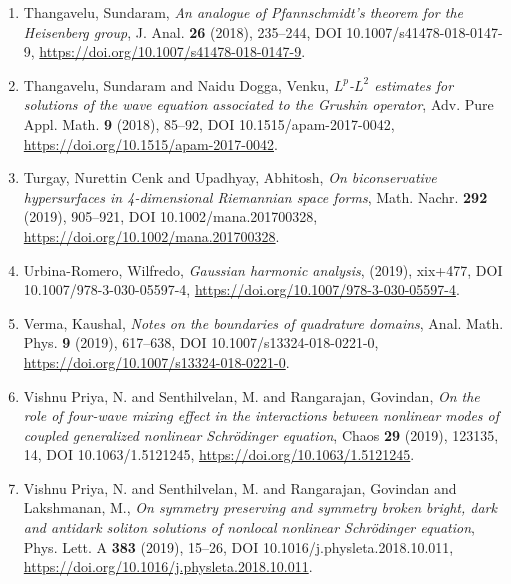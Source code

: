 \begin{enumerate}
\item Thangavelu, Sundaram, {\em An analogue of {P}fannschmidt's theorem for the {H}eisenberg
group}, J. Anal. {\bf 26} (2018), 235--244, DOI 10.1007/s41478-018-0147-9, \url{https://doi.org/10.1007/s41478-018-0147-9}.
\item Thangavelu, Sundaram and Naidu Dogga, Venku, {\em {$L^p$}-{$L^2$} estimates for solutions of the wave equation
associated to the {G}rushin operator}, Adv. Pure Appl. Math. {\bf 9} (2018), 85--92, DOI 10.1515/apam-2017-0042, \url{https://doi.org/10.1515/apam-2017-0042}.
\item Turgay, Nurettin Cenk and Upadhyay, Abhitosh, {\em On biconservative hypersurfaces in 4-dimensional {R}iemannian
space forms}, Math. Nachr. {\bf 292} (2019), 905--921, DOI 10.1002/mana.201700328, \url{https://doi.org/10.1002/mana.201700328}.
\item Urbina-Romero, Wilfredo, {\em Gaussian harmonic analysis},  {\bf } (2019), xix+477, DOI 10.1007/978-3-030-05597-4, \url{https://doi.org/10.1007/978-3-030-05597-4}.
\item Verma, Kaushal, {\em Notes on the boundaries of quadrature domains}, Anal. Math. Phys. {\bf 9} (2019), 617--638, DOI 10.1007/s13324-018-0221-0, \url{https://doi.org/10.1007/s13324-018-0221-0}.
\item Vishnu Priya, N. and Senthilvelan, M. and Rangarajan,
Govindan, {\em On the role of four-wave mixing effect in the interactions
between nonlinear modes of coupled generalized nonlinear
{S}chr\"{o}dinger equation}, Chaos {\bf 29} (2019), 123135, 14, DOI 10.1063/1.5121245, \url{https://doi.org/10.1063/1.5121245}.
\item Vishnu Priya, N. and Senthilvelan, M. and Rangarajan, Govindan
and Lakshmanan, M., {\em On symmetry preserving and symmetry broken bright, dark and
antidark soliton solutions of nonlocal nonlinear {S}chr\"{o}dinger
equation}, Phys. Lett. A {\bf 383} (2019), 15--26, DOI 10.1016/j.physleta.2018.10.011, \url{https://doi.org/10.1016/j.physleta.2018.10.011}.
\end{enumerate}
